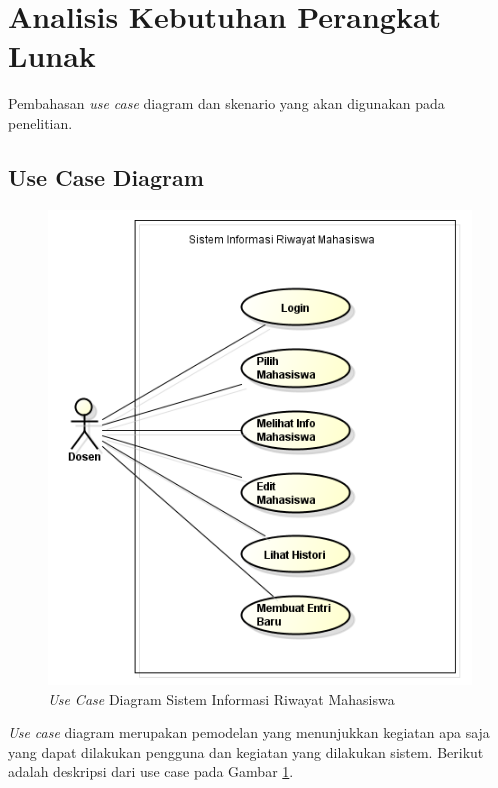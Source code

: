 \section{Analisis Kebutuhan Perangkat Lunak}
\label{sec:analisiskebutuhanperangkatlunak}

Pembahasan {\it use case} diagram dan skenario yang akan digunakan pada
penelitian.

\subsection{Use Case Diagram}
\begin{figure}[H]
\centering
\includegraphics[scale=0.8]{Gambar/usecase.png}
\caption[{\it Use Case} Diagram Sistem Informasi Riwayat Mahasiswa]{{\it Use
Case} Diagram Sistem Informasi Riwayat Mahasiswa}
\label{fig:usecase}
\end{figure}

{\it Use case} diagram merupakan pemodelan yang menunjukkan kegiatan apa saja
yang dapat dilakukan pengguna dan kegiatan yang dilakukan sistem. Berikut adalah
deskripsi dari use case pada Gambar \ref{fig:usecase}.

